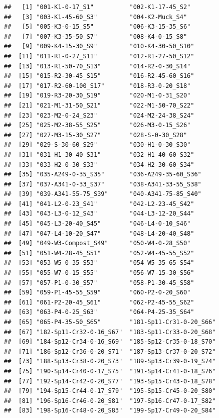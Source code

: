 \documentclass[]{article}
\begin{document}
\begin{verbatim}
##   [1] "001-K1-0-17_S1"          "002-K1-17-45_S2"        
##   [3] "003-K1-45-60_S3"         "004-K2-Muck_S4"         
##   [5] "005-K3-0-15_S5"          "006-K3-15-35_S6"        
##   [7] "007-K3-35-50_S7"         "008-K4-0-15_S8"         
##   [9] "009-K4-15-30_S9"         "010-K4-30-50_S10"       
##  [11] "011-R1-0-27_S11"         "012-R1-27-50_S12"       
##  [13] "013-R1-50-70_S13"        "014-R2-0-30_S14"        
##  [15] "015-R2-30-45_S15"        "016-R2-45-60_S16"       
##  [17] "017-R2-60-100_S17"       "018-R3-0-20_S18"        
##  [19] "019-R3-20-30_S19"        "020-M1-0-31_S20"        
##  [21] "021-M1-31-50_S21"        "022-M1-50-70_S22"       
##  [23] "023-M2-0-24_S23"         "024-M2-24-38_S24"       
##  [25] "025-M2-38-55_S25"        "026-M3-0-15_S26"        
##  [27] "027-M3-15-30_S27"        "028-S-0-30_S28"         
##  [29] "029-S-30-60_S29"         "030-H1-0-30_S30"        
##  [31] "031-H1-30-40_S31"        "032-H1-40-60_S32"       
##  [33] "033-H2-0-30_S33"         "034-H2-30-60_S34"       
##  [35] "035-A249-0-35_S35"       "036-A249-35-60_S36"     
##  [37] "037-A341-0-33_S37"       "038-A341-33-55_S38"     
##  [39] "039-A341-55-75_S39"      "040-A341-75-85_S40"     
##  [41] "041-L2-0-23_S41"         "042-L2-23-45_S42"       
##  [43] "043-L3-0-12_S43"         "044-L3-12-20_S44"       
##  [45] "045-L3-20-40_S45"        "046-L4-0-10_S46"        
##  [47] "047-L4-10-20_S47"        "048-L4-20-40_S48"       
##  [49] "049-W3-Compost_S49"      "050-W4-0-28_S50"        
##  [51] "051-W4-28-45_S51"        "052-W4-45-55_S52"       
##  [53] "053-W5-0-35_S53"         "054-W5-35-65_S54"       
##  [55] "055-W7-0-15_S55"         "056-W7-15-30_S56"       
##  [57] "057-P1-0-30_S57"         "058-P1-30-45_S58"       
##  [59] "059-P1-45-55_S59"        "060-P2-0-20_S60"        
##  [61] "061-P2-20-45_S61"        "062-P2-45-55_S62"       
##  [63] "063-P4-0-25_S63"         "064-P4-25-35_S64"       
##  [65] "065-P4-35-50_S65"        "181-Sp11-Cr31-0-20_S66" 
##  [67] "182-Sp11-Cr32-0-16_S67"  "183-Sp11-Cr33-0-20_S68" 
##  [69] "184-Sp12-Cr34-0-16_S69"  "185-Sp12-Cr35-0-18_S70" 
##  [71] "186-Sp12-Cr36-0-20_S71"  "187-Sp13-Cr37-0-20_S72" 
##  [73] "188-Sp13-Cr38-0-20_S73"  "189-Sp13-Cr39-0-19_S74" 
##  [75] "190-Sp14-Cr40-0-17_S75"  "191-Sp14-Cr41-0-18_S76" 
##  [77] "192-Sp14-Cr42-0-20_S77"  "193-Sp15-Cr43-0-18_S78" 
##  [79] "194-Sp15-Cr44-0-17_S79"  "195-Sp15-Cr45-0-20_S80" 
##  [81] "196-Sp16-Cr46-0-20_S81"  "197-Sp16-Cr47-0-17_S82" 
##  [83] "198-Sp16-Cr48-0-20_S83"  "199-Sp17-Cr49-0-20_S84" 

\end{verbatim}
\end{document}
